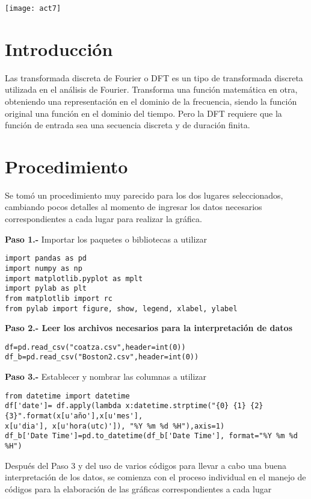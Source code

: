 \documentclass[12pt]{article}
\begin{document}
\begin{center}
	\texttt{[image: act7]}
	\end{center}

\section*{Introducción}
Las transformada discreta de Fourier o DFT es un tipo de transformada discreta utilizada en el análisis de Fourier. Transforma una función matemática en otra, obteniendo una representación en el dominio de la frecuencia, siendo la función original una función en el dominio del tiempo. Pero la DFT requiere que la función de entrada sea una secuencia discreta y de duración finita. 

\section*{Procedimiento}
Se tomó un procedimiento muy parecido para los dos lugares seleccionados, cambiando pocos detalles al momento de ingresar los datos necesarios correspondientes a cada lugar para realizar la gráfica.

\newpage
\textbf{Paso 1.-} Importar los paquetes o bibliotecas a utilizar

\begin{verbatim}
import pandas as pd
import numpy as np
import matplotlib.pyplot as mplt
import pylab as plt
from matplotlib import rc
from pylab import figure, show, legend, xlabel, ylabel
\end{verbatim}

\textbf{Paso 2.- Leer los archivos necesarios para la interpretación de datos}

\begin{verbatim}
df=pd.read_csv("coatza.csv",header=int(0))
df_b=pd.read_csv("Boston2.csv",header=int(0))
\end{verbatim}

\textbf{Paso 3.-} Establecer y nombrar las columnas a utilizar

\begin{verbatim}
from datetime import datetime
df['date']= df.apply(lambda x:datetime.strptime("{0} {1} {2}
{3}".format(x[u'año'],x[u'mes'],
x[u'dia'], x[u'hora(utc)']), "%Y %m %d %H"),axis=1)
df_b['Date Time']=pd.to_datetime(df_b['Date Time'], format="%Y %m %d %H")
\end{verbatim}

Después del Paso 3 y del uso de varios códigos para llevar a cabo una buena interpretación de los datos, se comienza con el proceso individual en el manejo de códigos para la elaboración de las gráficas correspondientes a cada lugar
\end{document}
